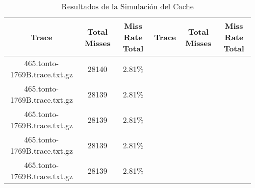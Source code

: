 \begin{table}[H]
\centering
\begin{tabular}{|c|c|c|c|c|c|}
\hline
Trace & Total Misses & Miss Rate Total & Trace & Total Misses & Miss Rate Total \\
\hline
465.tonto-1769B.trace.txt.gz & 28140 & 2.81\% & & & &  \\\hline
465.tonto-1769B.trace.txt.gz & 28139 & 2.81\% & & & &  \\\hline
465.tonto-1769B.trace.txt.gz & 28139 & 2.81\% & & & &  \\\hline
465.tonto-1769B.trace.txt.gz & 28139 & 2.81\% & & & &  \\\hline
465.tonto-1769B.trace.txt.gz & 28139 & 2.81\% & & & &  \\\hline
\hline
\end{tabular}
\caption{Resultados de la Simulación del Cache}
\label{tab:cache_results}
\end{table}